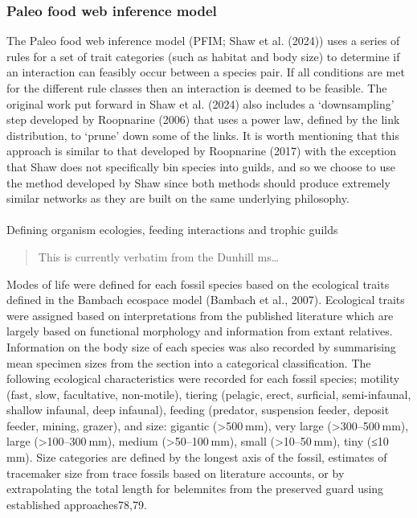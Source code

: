 \documentclass[
]{article}
\makeatletter
\let\oldparagraph\paragraph
\renewcommand{\paragraph}{
    \@ifstar
      \xxxParagraphStar
      \xxxParagraphNoStar
  }
\newcommand{\xxxParagraphStar}[1]{\oldparagraph*{#1}\mbox{}}
\newcommand{\xxxParagraphNoStar}[1]{\oldparagraph{#1}\mbox{}}
\makeatother
\begin{document}
\subsubsection{Paleo food web inference
model}\label{paleo-food-web-inference-model}

The Paleo food web inference model (PFIM; Shaw et al. (2024)) uses a
series of rules for a set of trait categories (such as habitat and body
size) to determine if an interaction can feasibly occur between a
species pair. If all conditions are met for the different rule classes
then an interaction is deemed to be feasible. The original work put
forward in Shaw et al. (2024) also includes a `downsampling' step
developed by Roopnarine (2006) that uses a power law, defined by the
link distribution, to `prune' down some of the links. It is worth
mentioning that this approach is similar to that developed by Roopnarine
(2017) with the exception that Shaw does not specifically bin species
into guilds, and so we choose to use the method developed by Shaw since
both methods should produce extremely similar networks as they are built
on the same underlying philosophy.

\paragraph{Defining organism ecologies, feeding interactions and trophic
guilds}\label{defining-organism-ecologies-feeding-interactions-and-trophic-guilds}

\begin{quote}
This is currently verbatim from the Dunhill ms\ldots{}
\end{quote}

Modes of life were defined for each fossil species based on the
ecological traits defined in the Bambach ecospace model (Bambach et al.,
2007). Ecological traits were assigned based on interpretations from the
published literature which are largely based on functional morphology
and information from extant relatives. Information on the body size of
each species was also recorded by summarising mean specimen sizes from
the section into a categorical classification. The following ecological
characteristics were recorded for each fossil species; motility (fast,
slow, facultative, non-motile), tiering (pelagic, erect, surficial,
semi-infaunal, shallow infaunal, deep infaunal), feeding (predator,
suspension feeder, deposit feeder, mining, grazer), and size: gigantic
(\textgreater500 mm), very large (\textgreater300--500 mm), large
(\textgreater100--300 mm), medium (\textgreater50--100 mm), small
(\textgreater10--50 mm), tiny (≤10 mm). Size categories are defined by
the longest axis of the fossil, estimates of tracemaker size from trace
fossils based on literature accounts, or by extrapolating the total
length for belemnites from the preserved guard using established
approaches78,79.
\end{document}
